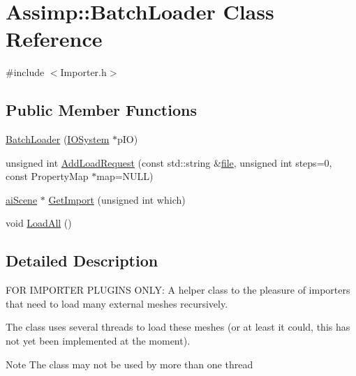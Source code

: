 \hypertarget{class_assimp_1_1_batch_loader}{\section{Assimp\+:\+:Batch\+Loader Class Reference}
\label{class_assimp_1_1_batch_loader}
}


{\ttfamily \#include $<$Importer.\+h$>$}

\subsection*{Public Member Functions}
\begin{DoxyCompactItemize}
\item 
\hyperlink{class_assimp_1_1_batch_loader_a7f83d33c5c06bd78fb8b0ac5ac7aa47c}{Batch\+Loader} (\hyperlink{class_assimp_1_1_i_o_system}{I\+O\+System} $\ast$p\+I\+O)
\item 
unsigned int \hyperlink{class_assimp_1_1_batch_loader_a232a69ba4ed9fe56eef23335d58c4d38}{Add\+Load\+Request} (const std\+::string \&\hyperlink{structfile}{file}, unsigned int steps=0, const Property\+Map $\ast$map=N\+U\+L\+L)
\item 
\hyperlink{structai_scene}{ai\+Scene} $\ast$ \hyperlink{class_assimp_1_1_batch_loader_a9086813b06fd0e5be443955805294e7c}{Get\+Import} (unsigned int which)
\item 
void \hyperlink{class_assimp_1_1_batch_loader_a5e18e205c9af88f7021614eb66f67087}{Load\+All} ()
\end{DoxyCompactItemize}


\subsection{Detailed Description}
F\+O\+R I\+M\+P\+O\+R\+T\+E\+R P\+L\+U\+G\+I\+N\+S O\+N\+L\+Y\+: A helper class to the pleasure of importers that need to load many external meshes recursively.

The class uses several threads to load these meshes (or at least it could, this has not yet been implemented at the moment).

\begin{DoxyNote}{Note}
The class may not be used by more than one thread 
\end{DoxyNote}


